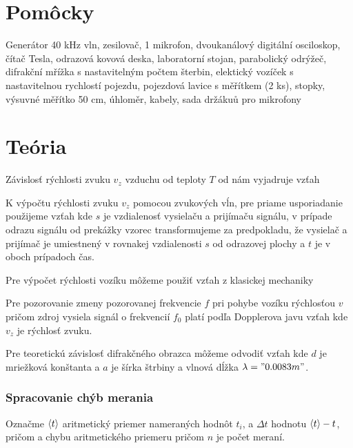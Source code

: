 \documentclass[a4paper,10pt]{article}
\begin{document}
\section{Pomôcky}
Generátor 40 kHz vln, zesilovač, 1 mikrofon, dvoukanálový digitální osciloskop, čítač
Tesla, odrazová kovová deska, laboratorní stojan, parabolický odrýžeč, difrakční mřížka s nastavitelným
počtem šterbin, elektický vozíček s nastavitelnou rychlostí pojezdu, pojezdová lavice
s měřítkem (2 ks), stopky, výsuvné měřítko 50 cm, úhloměr, kabely, sada držákuů pro mikrofony

\section{Teória}
Závislosť rýchlosti zvuku $v_z$ vzduchu od teploty $T$ od nám vyjadruje vzťah

K výpočtu rýchlosti zvuku $v_z$ pomocou zvukových vĺn, pre priame usporiadanie použijeme vzťah
kde $s$ je vzdialenosť vysielaču a prijímaču signálu, v prípade odrazu signálu od prekážky vzorec transformujeme
za predpokladu, že vysielač a prijímač je umiestnený v rovnakej vzdialenosti $s$ od odrazovej plochy a $t$ je v oboch prípadoch čas.


Pre výpočet rýchlosti vozíku môžeme použiť vzťah z klasickej mechaniky 

Pre pozorovanie zmeny pozorovanej frekvencie $f$ pri pohybe vozíku rýchlosťou $v$ pričom zdroj vysiela signál o frekvencií $f_0$ platí podľa Dopplerova javu vzťah
kde $v_z$ je rýchlosť zvuku.

Pre teoretickú závislosť difrakčného obrazca môžeme odvodiť vzťah
kde $d$ je mriežková konštanta a $a$ je šírka štrbiny a vlnová dĺžka $\lambda = "0.0083 m"$.

\subsubsection{Spracovanie chýb merania}

Označme $\left< t \right>$ aritmetický priemer nameraných hodnôt $t_i$, a $\Delta t$ hodnotu $\left< t \right>-t$, pričom 
a chybu aritmetického priemeru 
pričom $n$ je počet meraní.
\end{document}
